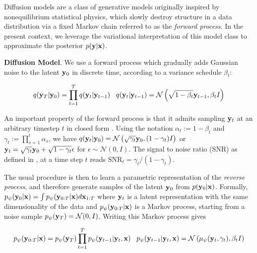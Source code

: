 \documentclass{article}
\begin{document}
Diffusion models \citep{SohlDickstein2015,Ho2020,Song2021} are a class of generative models originally inspired by nonequilibrium statistical physics, which slowly destroy structure in a data distribution via a fixed Markov chain referred to as the \emph{forward process}. In the present context, we leverage the variational interpretation of this model class \citep{Kingma2021,Kingma2023} to approximate the posterior $p(\bold{y}|\bold{x})$. 

\textbf{Diffusion Model}. We use a forward process which gradually adds Gaussian noise to the latent $\bold{y}_0$ in discrete time, according to a variance schedule $\beta_{t}$:

\begin{equation}
q(\bold{y}_{T}|\bold{y}_{0}) = \prod_{t=1}^{T}q(\bold{y}_{t}|\bold{y}_{t-1}) \;\;\; q(\bold{y}_{t}|\bold{y}_{t-1}) = \mathcal{N}\left(\sqrt{1-\beta_{t}}\bold{y}_{t-1},\beta_t I\right)
\end{equation}

An important property of the forward process is that it admits sampling $\bold{y}_t$ at an arbitrary timestep $t$ in closed form \citep{Ho2020}. Using the notation $\alpha_t := 1 - \beta_t$ and $\gamma_t := \prod_{s=1}^{t} \alpha_s$, we have $q(\bold{y}_t|\bold{y}_0) = \mathcal{N} \left(\sqrt{\gamma_{t}} \bold{y}_{0}, (1 - \gamma_t)I \right)$ or $\bold{y}_{t} = \sqrt{\gamma_{t}}\bold{y}_{0} + \sqrt{1-\gamma_{t}}\bold{\epsilon}$ for $\epsilon \sim \mathcal{N}(0,I)$. The signal to noise ratio (SNR) as defined in \citep{Kingma2023}, at a time step $t$ reads $\mathrm{SNR}_t = \gamma_{t}/(1-\gamma_{t})$.

The usual procedure is then to learn a parametric representation of the \emph{reverse process}, and therefore generate samples of the latent $\bold{y}_{0}$ from  $p(\bold{y}_{0}|\bold{x})$. Formally, $p_{\psi}(\bold{y}_{0}|\bold{x}) = \int p_{\psi}(\bold{y}_{0:T}|\bold{x})d\bold{x}_{1:T}$ where $\bold{y}_{t}$ is a latent representation with the same dimensionality of the data and $p_{\psi}(\bold{y}_{0:T}|\bold{x})$ is a Markov process, starting from a noise sample $p_{\psi}(\bold{y}_{T}) = \mathcal{N}(0,I)$. Writing this Markov process gives

\begin{equation}
p_{\psi}(\bold{y}_{0:T}|\bold{x}) = p_{\psi}(\bold{y}_{T})\prod_{t=1}^{T} p_{\psi}(\bold{y}_{t-1}|\bold{y}_{t},\bold{x}) \;\;\; p_{\psi}(\bold{y}_{t-1}|\bold{y}_{t},\bold{x}) = \mathcal{N}\left(\mu_{\psi}(\bold{y}_{t},\gamma_{t}),\beta_{t}I\right)
\end{equation}
\end{document}
